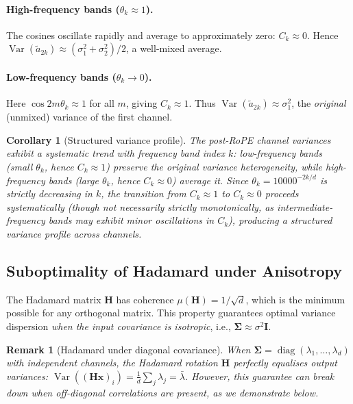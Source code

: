 \documentclass[11pt,a4paper]{article}
\newtheorem{corollary}[theorem]{Corollary}
\newtheorem{remark}{Remark}
\DeclareMathOperator{\Var}{Var}
\DeclareMathOperator{\diag}{diag}
\newcommand{\bx}{\mathbf{x}}
\newcommand{\bH}{\mathbf{H}}
\newcommand{\bI}{\mathbf{I}}
\newcommand{\bSigma}{\boldsymbol{\Sigma}}
\begin{document}
\paragraph{High-frequency bands ($\theta_k \approx 1$).}
The cosines oscillate rapidly and average to approximately zero: $C_k \approx 0$.
Hence $\Var(\tilde{a}_{2k}) \approx (\sigma_1^2 + \sigma_2^2)/2$, a well-mixed average.

\paragraph{Low-frequency bands ($\theta_k \to 0$).}
Here $\cos 2m\theta_k \approx 1$ for all $m$, giving $C_k \approx 1$.
Thus $\Var(\tilde{a}_{2k}) \approx \sigma_1^2$, the \emph{original} (unmixed) variance of the first channel.

\begin{corollary}[Structured variance profile]
\label{cor:monotonic}
The post-RoPE channel variances exhibit a systematic trend with frequency band index $k$: low-frequency bands (small $\theta_k$, hence $C_k \approx 1$) preserve the original variance heterogeneity, while high-frequency bands (large $\theta_k$, hence $C_k \approx 0$) average it.
Since $\theta_k = 10000^{-2k/d}$ is strictly decreasing in $k$, the transition from $C_k \approx 1$ to $C_k \approx 0$ proceeds systematically (though not necessarily strictly monotonically, as intermediate-frequency bands may exhibit minor oscillations in $C_k$), producing a structured variance profile across channels.
\end{corollary}

\subsection{Suboptimality of Hadamard under Anisotropy}

The Hadamard matrix $\bH$ has coherence $\mu(\bH) = 1/\sqrt{d}$, which is the minimum possible for any orthogonal matrix.
This property guarantees optimal variance dispersion \emph{when the input covariance is isotropic}, i.e., $\bSigma \approx \sigma^2 \bI$.

\begin{remark}[Hadamard under diagonal covariance]
\label{rem:hadamard_diag}
When $\bSigma = \diag(\lambda_1, \ldots, \lambda_d)$ with independent channels, the Hadamard rotation $\bH$ perfectly equalises output variances:
$\Var((\bH\bx)_i) = \frac{1}{d}\sum_j \lambda_j = \bar{\lambda}$.
However, this guarantee can break down when off-diagonal correlations are present, as we demonstrate below.
\end{remark}
\end{document}
